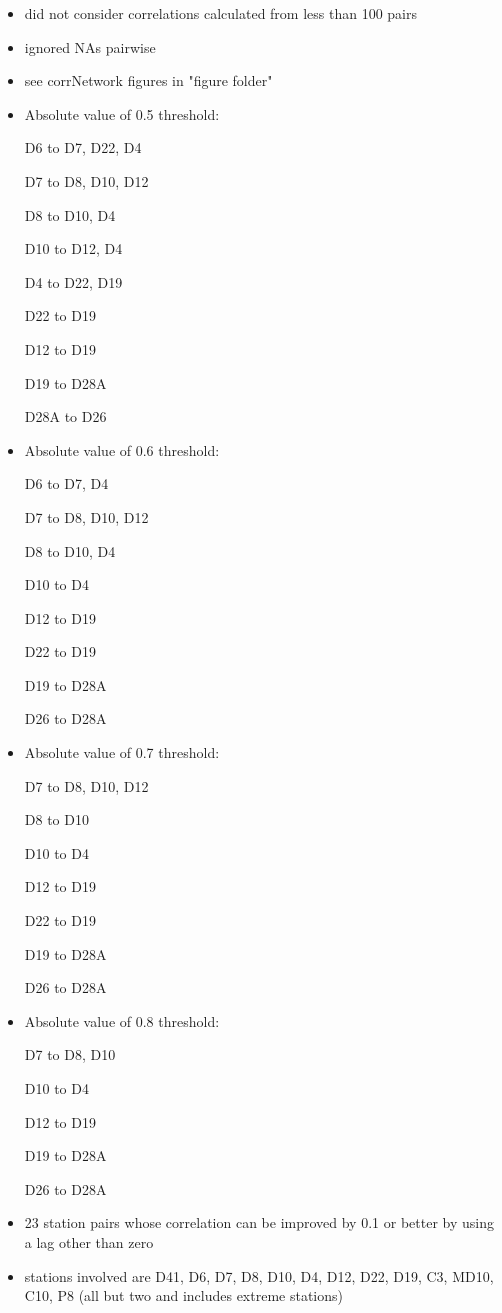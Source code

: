 \documentclass[12pt]{amsart}
\begin{document}
\begin{itemize}
\item did not consider correlations calculated from less than 100 pairs
\item ignored NAs pairwise
\item see corrNetwork figures in "figure folder"
\end{itemize}

\begin{itemize}
\item Absolute value of 0.5 threshold: 

D6 to D7, D22, D4

D7 to D8, D10, D12

D8 to D10, D4

D10 to D12, D4

D4 to D22, D19

D22 to D19

D12 to D19

D19 to D28A

D28A to D26
\item Absolute value of 0.6 threshold:

D6 to D7, D4

D7 to D8, D10, D12

D8 to D10, D4

D10 to D4

D12 to D19

D22 to D19

D19 to D28A

D26 to D28A

\item Absolute value of 0.7 threshold:

D7 to D8, D10, D12

D8 to D10

D10 to D4

D12 to D19

D22 to D19

D19 to D28A

D26 to D28A


\item Absolute value of 0.8 threshold:

D7 to D8, D10

D10 to D4

D12 to D19

D19 to D28A

D26 to D28A

\item 23 station pairs whose correlation can be improved by 0.1 or better by using a lag other than zero
\item stations involved are D41, D6, D7, D8, D10, D4, D12, D22, D19, C3, MD10, C10, P8
(all but two and includes extreme stations)

\end{itemize}
\end{document}
